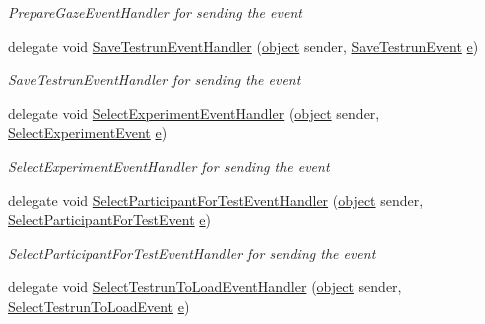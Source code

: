 \begin{DoxyCompactItemize}
\begin{DoxyCompactList}\small\item\em Prepare\+Gaze\+Event\+Handler for sending the event \end{DoxyCompactList}\item 
delegate void \hyperlink{namespace_web_analyzer_1_1_events_a9098c4173b88eaba72d001027bf62247}{Save\+Testrun\+Event\+Handler} (\hyperlink{_u_i_2_h_t_m_l_resources_2js_2lib_2underscore_8min_8js_aae18b7515bb2bc4137586506e7c0c903}{object} sender, \hyperlink{class_web_analyzer_1_1_events_1_1_save_testrun_event}{Save\+Testrun\+Event} \hyperlink{_u_i_2_h_t_m_l_resources_2js_2lib_2bootstrap_8min_8js_ab5902775854a8b8440bcd25e0fe1c120}{e})
\begin{DoxyCompactList}\small\item\em Save\+Testrun\+Event\+Handler for sending the event \end{DoxyCompactList}\item 
delegate void \hyperlink{namespace_web_analyzer_1_1_events_a9c2d51d41cfd94fb68f500d1f1a1bb10}{Select\+Experiment\+Event\+Handler} (\hyperlink{_u_i_2_h_t_m_l_resources_2js_2lib_2underscore_8min_8js_aae18b7515bb2bc4137586506e7c0c903}{object} sender, \hyperlink{class_web_analyzer_1_1_events_1_1_select_experiment_event}{Select\+Experiment\+Event} \hyperlink{_u_i_2_h_t_m_l_resources_2js_2lib_2bootstrap_8min_8js_ab5902775854a8b8440bcd25e0fe1c120}{e})
\begin{DoxyCompactList}\small\item\em Select\+Experiment\+Event\+Handler for sending the event \end{DoxyCompactList}\item 
delegate void \hyperlink{namespace_web_analyzer_1_1_events_a9cc4b679de471119a1ec1586aa0540f9}{Select\+Participant\+For\+Test\+Event\+Handler} (\hyperlink{_u_i_2_h_t_m_l_resources_2js_2lib_2underscore_8min_8js_aae18b7515bb2bc4137586506e7c0c903}{object} sender, \hyperlink{class_web_analyzer_1_1_events_1_1_select_participant_for_test_event}{Select\+Participant\+For\+Test\+Event} \hyperlink{_u_i_2_h_t_m_l_resources_2js_2lib_2bootstrap_8min_8js_ab5902775854a8b8440bcd25e0fe1c120}{e})
\begin{DoxyCompactList}\small\item\em Select\+Participant\+For\+Test\+Event\+Handler for sending the event \end{DoxyCompactList}\item 
delegate void \hyperlink{namespace_web_analyzer_1_1_events_aa0653fa1d1d88eca5706ba8a8db7e7bb}{Select\+Testrun\+To\+Load\+Event\+Handler} (\hyperlink{_u_i_2_h_t_m_l_resources_2js_2lib_2underscore_8min_8js_aae18b7515bb2bc4137586506e7c0c903}{object} sender, \hyperlink{class_web_analyzer_1_1_events_1_1_select_testrun_to_load_event}{Select\+Testrun\+To\+Load\+Event} \hyperlink{_u_i_2_h_t_m_l_resources_2js_2lib_2bootstrap_8min_8js_ab5902775854a8b8440bcd25e0fe1c120}{e})

\end{DoxyCompactItemize}
